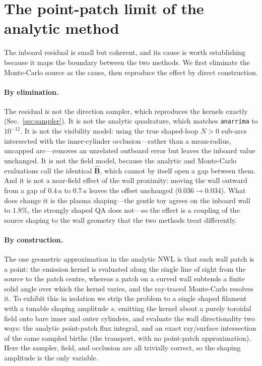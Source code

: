 \documentclass[11pt]{article}
\newcommand{\Bhat}{\hat{\bm{B}}}
\begin{document}
\section{The point-patch limit of the analytic method}
\label{sec:pointpatch}

The inboard residual is small but coherent, and its cause is worth establishing because it
maps the boundary between the two methods. We first eliminate the Monte-Carlo source as
the cause, then reproduce the effect by direct construction.

\paragraph{By elimination.}
The residual is not the direction sampler, which reproduces the kernels exactly
(Sec.~\ref{sec:sampler}). It is not the analytic quadrature, which matches
\texttt{anarr\'ima} to $10^{-12}$. It is not the visibility model: using the true
shaped-loop $N>0$ sub-arcs intersected with the inner-cylinder occlusion---rather than a
mean-radius, uncapped arc---removes an unrelated outboard error but leaves the inboard
value unchanged. It is not the field model, because the analytic and Monte-Carlo
evaluations call the identical $\Bhat$, which cannot by itself open a gap between them. And
it is not a near-field effect of the wall proximity: moving the wall outward from a gap of
$0.4\,a$ to $0.7\,a$ leaves the offset unchanged ($0.036\to0.034$). What does change it is
the plasma shaping---the gentle toy agrees on the inboard wall to $1.8\%$, the strongly
shaped QA does not---so the effect is a coupling of the source shaping to the wall
geometry that the two methods treat differently.

\paragraph{By construction.}
The one geometric approximation in the analytic NWL is that each wall patch is a point:
the emission kernel is evaluated along the single line of sight from the source to the
patch centre, whereas a patch on a curved wall subtends a finite solid angle over which
the kernel varies, and the ray-traced Monte-Carlo resolves it. To exhibit this in
isolation we strip the problem to a single shaped filament with a tunable shaping
amplitude $s$, emitting the kernel about a purely toroidal field onto bare inner and outer
cylinders, and evaluate the wall directionality two ways: the analytic point-patch flux
integral, and an exact ray/surface intersection of the same sampled births (the transport,
with no point-patch approximation). Here the sampler, field, and occlusion are all
trivially correct, so the shaping amplitude is the only variable.
\end{document}
